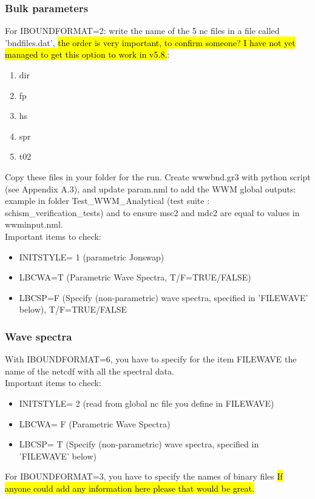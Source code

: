 \documentclass[preprints,briefreport,accept,oneauthor,pdftex]{Definitions/mdpi}
\begin{document}
\subsubsection{Bulk parameters}
\noindent For IBOUNDFORMAT=2: write the name of the 5 nc files in a file called 'bndfiles.dat', \hl{the order is very important, to confirm someone? I have not yet managed to get this option to work in v5.8.}: \begin{enumerate}
    \item dir
    \item fp
    \item hs
    \item spr
    \item t02
\end{enumerate}
Copy these files in your folder for the run. Create wwwbnd.gr3 with python script (see Appendix A.3), and update param.nml to add the WWM global outputs: example in folder Test\_WWM\_Analytical (test suite : schism\_verification\_tests) and to ensure msc2 and mdc2 are equal to values in wwminput.nml.\\
Important items to check:
\begin{itemize}
    \item INITSTYLE= 1 (parametric Jonswap)
    \item LBCWA=T (Parametric Wave Spectra, T/F=TRUE/FALSE)
    \item LBCSP=F (Specify (non-parametric) wave spectra, specified in 'FILEWAVE' below),  T/F=TRUE/FALSE
\end{itemize}
\subsubsection{Wave spectra}
\noindent With IBOUNDFORMAT=6, you have to specify for the item FILEWAVE the name of the netcdf with all the spectral data.\\
Important items to check:
\begin{itemize}
   \item INITSTYLE= 2 (read from global nc file you define in FILEWAVE)
    \item LBCWA= F (Parametric Wave Spectra)
    \item LBCSP= T (Specify (non-parametric) wave spectra, specified in 'FILEWAVE' below)
\end{itemize}

For IBOUNDFORMAT=3, you have to specify the names of binary files \hl{If anyone could add any information here please that would be great.}
\end{document}
